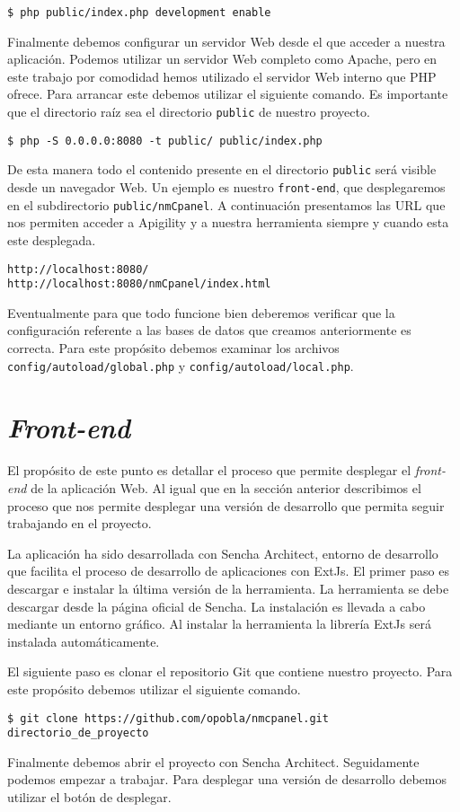 	\begin{lstlisting}[style=myBash]
$ php public/index.php development enable
	\end{lstlisting}
	Finalmente debemos configurar un servidor Web desde el que acceder a nuestra aplicación. Podemos utilizar un servidor Web completo como
	Apache\cite{Apache}, pero en este trabajo por comodidad hemos utilizado el servidor Web interno que PHP ofrece. Para arrancar este debemos
	utilizar el siguiente comando. Es importante que  el directorio raíz sea el directorio \texttt{public} de nuestro proyecto.
	\begin{lstlisting}[style=myBash]
$ php -S 0.0.0.0:8080 -t public/ public/index.php
	\end{lstlisting}
	De esta manera todo el contenido presente en el directorio \texttt{public} será visible desde un navegador Web. Un ejemplo es nuestro
	\texttt{front-end}, que desplegaremos en el subdirectorio \texttt{public/nmCpanel}. A continuación presentamos las URL que nos permiten
	acceder a Apigility y a nuestra herramienta siempre y cuando esta este desplegada.
	\begin{lstlisting}[style=myFile]
http://localhost:8080/
http://localhost:8080/nmCpanel/index.html
	\end{lstlisting}
	Eventualmente para que todo funcione bien deberemos verificar que la configuración referente a las bases de datos que creamos anteriormente es
	correcta. Para este propósito debemos examinar los archivos \texttt{config/autoload/global.php} y \texttt{config/autoload/local.php}.

\section{\emph{Front-end}}
	\label{app_front}
	El propósito de este punto es detallar el proceso que permite desplegar el \emph{front-end} de la aplicación Web. Al igual que en la sección
	anterior describimos el proceso que nos permite desplegar una versión de desarrollo que permita seguir trabajando en el proyecto.
	\par
	La aplicación ha sido desarrollada con Sencha Architect, entorno de desarrollo que facilita el proceso de desarrollo de aplicaciones con
	ExtJs. El primer paso es descargar e instalar la última versión de la herramienta. La herramienta se debe descargar desde la página oficial de
	Sencha. La instalación es llevada a cabo mediante un entorno gráfico. Al instalar la herramienta la librería ExtJs será instalada
	automáticamente.
	\par
	El siguiente paso es clonar el repositorio Git que contiene nuestro proyecto. Para este propósito debemos utilizar el siguiente comando.
	\begin{lstlisting}[style=myBash]
$ git clone https://github.com/opobla/nmcpanel.git directorio_de_proyecto
	\end{lstlisting}
	Finalmente debemos abrir el proyecto con Sencha Architect.  Seguidamente podemos empezar a trabajar. Para desplegar una versión de desarrollo
	debemos utilizar el botón de desplegar.


